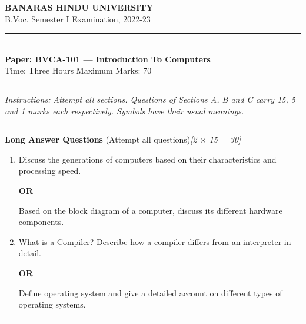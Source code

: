 \documentclass[11pt,a4paper]{article}
\newcommand{\pts}[1]{\hfill   \textit{[#1]}}
\begin{document}
\begin{center}
  {\large\bfseries BANARAS HINDU UNIVERSITY}\\[2pt]
  {\normalsize B.Voc. Semester I Examination, 2022-23}\\[6pt]
  \rule{0.8\linewidth}{0.5pt}\\[6pt]
  {\large\bfseries Paper: BVCA-101 --- Introduction To Computers}\\[4pt]
  {\normalsize Time: Three Hours \hfill Maximum Marks: 70}
\end{center}

\rule{\linewidth}{0.4pt}

\smallskip



\noindent   \textit{Instructions: Attempt all sections. Questions of Sections A, B and C carry 15, 5 and 1 marks each respectively. Symbols have their usual meanings.}

\bigskip

\bigskip



\rule{\linewidth}{0.4pt}\smallskip




\noindent   \textbf{Long Answer Questions} (Attempt all questions)\pts{2 $ \times$ 15 = 30}

\begin{enumerate}[label=\arabic*.,leftmargin=*,itemsep=12pt]
  \item Discuss the generations of computers based on their characteristics and processing speed.
  
\begin{center}   \textbf{OR}\end{center}
  Based on the block diagram of a computer, discuss its different hardware components.
  \item What is a Compiler? Describe how a compiler differs from an interpreter in detail.
  
\begin{center}   \textbf{OR}\end{center}
  Define operating system and give a detailed account on different types of operating systems.
\end{enumerate}

\bigskip



\rule{\linewidth}{0.4pt}\smallskip
\end{document}
